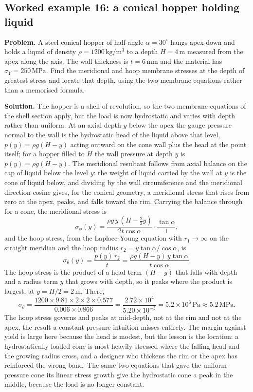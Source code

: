 \subsection*{Worked example 16: a conical hopper holding liquid}

\textbf{Problem.} A steel conical hopper of half-angle $\alpha = 30^\circ$
hangs apex-down and holds a liquid of density $\rho = 1200\,\si{\kilogram
\per\meter\cubed}$ to a depth $H = 4\,\si{\meter}$ measured from the apex
along the axis. The wall thickness is $t = 6\,\si{\milli\meter}$ and the
material has $\sigma_Y = 250\,\text{MPa}$. Find the meridional and hoop
membrane stresses at the depth of greatest stress and locate that depth,
using the two membrane equations rather than a memorised formula.

\textbf{Solution.} The hopper is a shell of revolution, so the two
membrane equations of the shell section apply, but the load is now
hydrostatic and varies with depth rather than uniform. At an axial depth
$y$ below the apex the gauge pressure normal to the wall is the
hydrostatic head of the liquid above that level, $p(y) = \rho g (H - y)$
acting outward on the cone wall plus the head at the point itself; for a
hopper filled to $H$ the wall pressure at depth $y$ is $p(y) = \rho g
(H - y)$. The meridional resultant follows from axial balance on the cap
of liquid below the level $y$: the weight of liquid carried by the wall at
$y$ is the cone of liquid below, and dividing by the wall circumference
and the meridional direction cosine gives, for the conical geometry, a
meridional stress that rises from zero at the apex, peaks, and falls
toward the rim. Carrying the balance through for a cone, the meridional
stress is
\[
\sigma_\phi(y) = \frac{\rho g\, y\,(H - \tfrac{2}{3}y)}{2 t \cos\alpha} \cdot
\frac{\tan\alpha}{1},
\]
and the hoop stress, from the Laplace-Young equation with $r_1 \to \infty$
on the straight meridian and the hoop radius $r_2 = y\tan\alpha/\cos\alpha$,
is
\[
\sigma_\theta(y) = \frac{p(y)\, r_2}{t}
= \frac{\rho g (H - y)\, y \tan\alpha}{t \cos\alpha}.
\]
The hoop stress is the product of a head term $(H - y)$ that falls with
depth and a radius term $y$ that grows with depth, so it peaks where the
product is largest, at $y = H/2 = 2\,\si{\meter}$. There,
\[
\sigma_\theta = \frac{1200 \times 9.81 \times 2 \times 2 \times 0.577}
{0.006 \times 0.866}
= \frac{2.72\times 10^4}{5.20\times 10^{-3}}
= 5.2\times 10^{6}\,\text{Pa} \approx 5.2\,\text{MPa}.
\]
The hoop stress governs and peaks at mid-depth, not at the rim and not at
the apex, the result a constant-pressure intuition misses entirely. The
margin against yield is large here because the head is modest, but the
lesson is the location: a hydrostatically loaded cone is most heavily
stressed where the falling head and the growing radius cross, and a
designer who thickens the rim or the apex has reinforced the wrong band.
The same two equations that gave the uniform-pressure cone its linear
stress growth give the hydrostatic cone a peak in the middle, because the
load is no longer constant.

